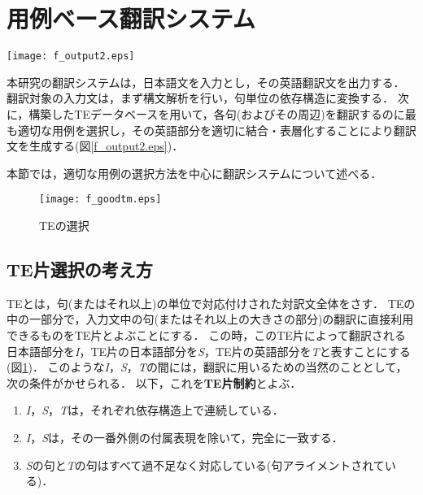 \documentclass{nlp}
\begin{document}
\section{用例ベース翻訳システム}

\begin{figure*}
\begin{center}
	\texttt{[image: f\_output2.eps]}
\end{center}
\caption{手法のながれ}
\label{f_output2.eps}
\end{figure*}

本研究の翻訳システムは，日本語文を入力とし，その英語翻訳文を出力する．
翻訳対象の入力文は，まず構文解析を行い，句単位の依存構造に変換する．
次に，構築したTEデータベースを用いて，各句(およびその周辺)を翻訳するのに最も適切な用例を選択し，その英語部分を適切に結合・表層化することにより翻訳文を生成する(図\ref{f_output2.eps})．

本節では，適切な用例の選択方法を中心に翻訳システムについて述べる．

\begin{figure}
\begin{center}
	\texttt{[image: f\_goodtm.eps]}
\end{center}
\caption{TEの選択}
\label{f_goodtm.eps}
\end{figure}

\subsection{TE片選択の考え方} \label{sec:outline}

TEとは，句(またはそれ以上)の単位で対応付けされた対訳文全体をさす．
TEの中の一部分で，入力文中の句(またはそれ以上の大きさの部分)の翻訳に直接利用できるものをTE片とよぶことにする．
この時，このTE片によって翻訳される日本語部分を{\it I}，TE片の日本語部分を{\it S}，TE片の英語部分を{\it T}と表すことにする(図\ref{f_goodtm.eps})．
このような{\it I}，{\it S}，{\it T}の間には，翻訳に用いるための当然のこととして，次の条件がかせられる．
以下，これを\textbf{TE片制約}とよぶ．

\begin{enumerate}
\item {\it I}，{\it S}，{\it T}は，それぞれ依存構造上で連続している．
\item {\it I}，{\it S}は，その一番外側の付属表現を除いて，完全に一致する．
\item {\it S}の句と{\it T}の句はすべて過不足なく対応している(句アライメントされている)．
\end{enumerate}
\end{document}
